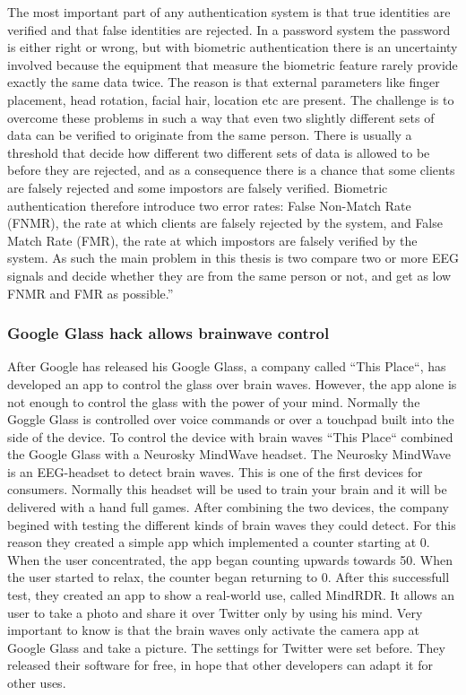 The most important part of any authentication system is that true identities are verified and that false identities are rejected. In a password system the password is either right or wrong, but with biometric authentication there is an uncertainty involved because the equipment that  measure the biometric feature rarely provide exactly the same data twice. The reason is that external parameters like finger placement, head rotation, facial hair, location etc are present. The challenge is to overcome these problems in such a way that even two slightly different sets of data can be verified to originate from the same person. There is usually a threshold that decide how different
two different sets of data is allowed to be before they are rejected, and as a consequence there is a chance that some clients are falsely rejected and some impostors are falsely verified.
Biometric authentication therefore introduce two error rates: False Non-Match Rate (FNMR), the rate at which clients are falsely rejected by the system, and False Match Rate (FMR), the rate at which impostors are falsely verified by the system. As such the main problem in this thesis is two compare two or more EEG signals and decide whether they are from the same person or not, and get as low FNMR and FMR as possible.''

\subsubsection{Google Glass hack allows brainwave control}
After Google has released his Google Glass, a company called ``This Place``, has developed an app to control the glass over brain waves. However, the app alone is not enough to control the glass with the power of your mind. Normally the Goggle Glass is controlled over voice commands or over a touchpad built into the side of the device. To control the device with brain waves ``This Place`` combined the Google Glass with a Neurosky MindWave headset. The Neurosky MindWave is an EEG-headset to detect brain waves. This is one of the first devices for consumers. Normally this headset will be used to train your brain and it will be delivered with a hand full games. After combining the two devices, the company begined with testing the different kinds of brain waves they could detect. For this reason they created a simple app which implemented a counter starting at 0. When the user concentrated, the app began counting upwards towards 50. When the user started to relax, the counter began returning to 0. After this successfull test, they created an app to show a real-world use, called MindRDR. It allows an user to take a photo and share it over Twitter only by using his mind. Very important to know is that the brain waves only activate the camera app at Google Glass and take a picture. The settings for Twitter were set before. They released their software for free, in hope that other developers can adapt it for other uses.

